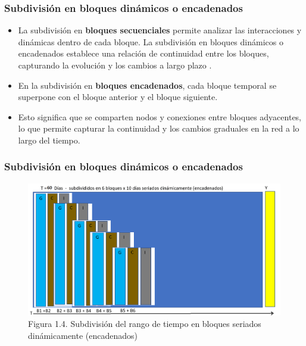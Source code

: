 \documentclass{beamer}
\begin{document}
\begin{frame}
	\frametitle{Subdivisión en bloques dinámicos o encadenados}
	\begin{itemize}
		\item La subdivisión en \textbf{bloques secuenciales} permite analizar las interacciones y dinámicas dentro de cada bloque. La subdivisión en bloques dinámicos o encadenados establece una relación de continuidad entre los bloques, capturando la evolución y los cambios a largo plazo \citep{Mahmoud_2021,  tang2010a}.
		\item En la subdivisión en \textbf{bloques encadenados}, cada bloque temporal se superpone con el bloque anterior y el bloque siguiente. 
		\item Esto significa que se comparten nodos y conexiones entre bloques adyacentes, lo que permite capturar la continuidad y los cambios graduales en la red a lo largo del tiempo.
	\end{itemize}	
\end{frame}

\begin{frame}
	\frametitle{Subdivisión en bloques dinámicos o encadenados}
	\begin{figure}[H]
		\centering
		\includegraphics[width=0.7\linewidth]{figs/imagen21t}
		\caption{Figura 1.4. Subdivisión del rango de tiempo en bloques seriados dinámicamente (encadenados)}
	\end{figure}
	
\end{frame}
\end{document}
